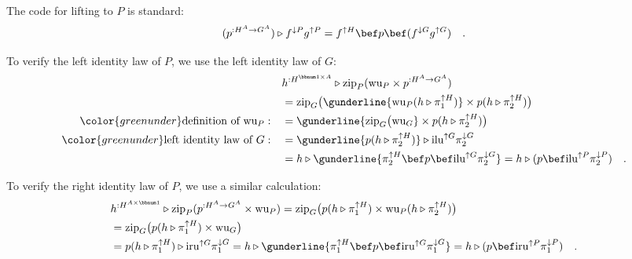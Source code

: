 The code for lifting to $P$ is standard:
\[
(p^{:H^{A}\rightarrow G^{A}})\triangleright f^{\downarrow P}g^{\uparrow P}=f^{\uparrow H}\bef p\bef(f^{\downarrow G}g^{\uparrow G})\quad.
\]

To verify the left identity law of $P$, we use the left identity
law of $G$:
\begin{align*}
 & h^{:H^{\bbnum 1\times A}}\triangleright\text{zip}_{P}(\text{wu}_{P}\times p^{:H^{A}\rightarrow G^{A}})\\
 & =\text{zip}_{G}\big(\gunderline{\text{wu}_{P}(h\triangleright\pi_{1}^{\uparrow H})}\times p(h\triangleright\pi_{2}^{\uparrow H})\big)\\
{\color{greenunder}\text{definition of }\text{wu}_{P}:}\quad & =\gunderline{\text{zip}_{G}\big(\text{wu}_{G}}\times p(h\triangleright\pi_{2}^{\uparrow H})\big)\\
{\color{greenunder}\text{left identity law of }G:}\quad & =\gunderline{p(h\triangleright\pi_{2}^{\uparrow H})}\triangleright\text{ilu}^{\uparrow G}\pi_{2}^{\downarrow G}\\
 & =h\triangleright\gunderline{\pi_{2}^{\uparrow H}\bef p\bef\text{ilu}^{\uparrow G}\pi_{2}^{\downarrow G}}=h\triangleright(p\bef\text{ilu}^{\uparrow P}\pi_{2}^{\downarrow P})\quad.
\end{align*}

To verify the right identity law of $P$, we use a similar calculation:
\begin{align*}
 & h^{:H^{A\times\bbnum 1}}\triangleright\text{zip}_{P}(p^{:H^{A}\rightarrow G^{A}}\times\text{wu}_{P})=\text{zip}_{G}\big(p(h\triangleright\pi_{1}^{\uparrow H})\times\text{wu}_{P}(h\triangleright\pi_{2}^{\uparrow H})\big)\\
 & =\text{zip}_{G}\big(p(h\triangleright\pi_{1}^{\uparrow H})\times\text{wu}_{G}\big)\\
 & =p(h\triangleright\pi_{1}^{\uparrow H})\triangleright\text{iru}^{\uparrow G}\pi_{1}^{\downarrow G}=h\triangleright\gunderline{\pi_{1}^{\uparrow H}\bef p\bef\text{iru}^{\uparrow G}\pi_{1}^{\downarrow G}}=h\triangleright(p\bef\text{iru}^{\uparrow P}\pi_{1}^{\downarrow P})\quad.
\end{align*}

